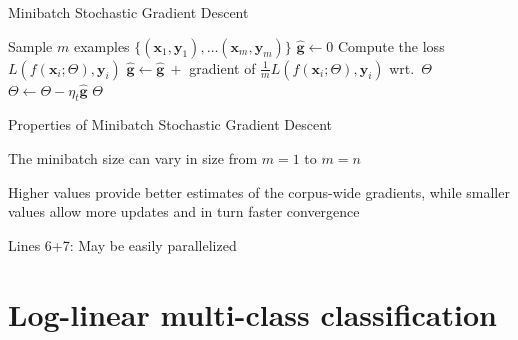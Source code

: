 \documentclass[12pt,aspectratio=169,handout]{beamer}
\begin{document}
\begin{frame}{Minibatch Stochastic Gradient Descent}
	
	\begin{algorithmic}[1]
		\State Sample $m$ examples $\{ (\bm{x}_1, \bm{y}_1), \ldots (\bm{x}_m, \bm{y}_m) \}$
		\State $\hat{\bm{g}} \gets 0$
		\State Compute the loss $L(f(\bm{x}_i; \Theta), \bm{y}_i)$
		\State $\hat{\bm{g}} \gets \hat{\bm{g}}\ + $ gradient of $\frac{1}{m} L(f(\bm{x}_i; \Theta), \bm{y}_i)$ wrt.\ $\Theta$
		\EndFor
		\State $\Theta \gets \Theta - \eta_t \hat{\bm{g}}$
		\EndWhile
		\State \Return $\Theta$
		\EndFunction
	\end{algorithmic}
	
	
\end{frame}

\begin{frame}{Properties of Minibatch Stochastic Gradient Descent}
	
	The minibatch size can vary in size from $m = 1$ to $m = n$
	
	Higher values provide better estimates of the corpus-wide gradients, while smaller values allow more updates and in turn faster convergence
	
	Lines 6+7: May be easily parallelized
	
\end{frame}


\section{Log-linear multi-class classification}
\end{document}
